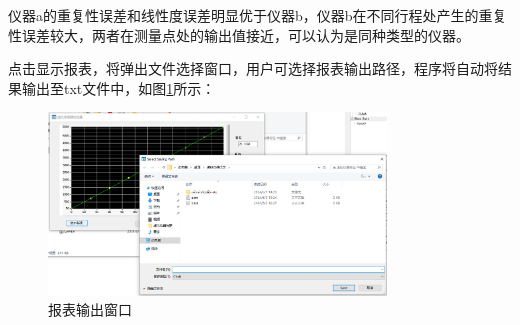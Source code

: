 \documentclass[a4paper,12pt,twoside]{article}%
\begin{document}
仪器a的重复性误差和线性度误差明显优于仪器b，仪器b在不同行程处产生的重复性误差较大，两者在测量点处的输出值接近，可以认为是同种类型的仪器。\par
点击显示报表，将弹出文件选择窗口，用户可选择报表输出路径，程序将自动将结果输出至txt文件中，如图\ref{fig:report}所示：
\begin{figure}[H]
  \centering
  \includegraphics[width=0.8\textwidth]{报表输出窗口.png}
  \caption{报表输出窗口}
  \label{fig:report}
\end{figure}
\end{document}
